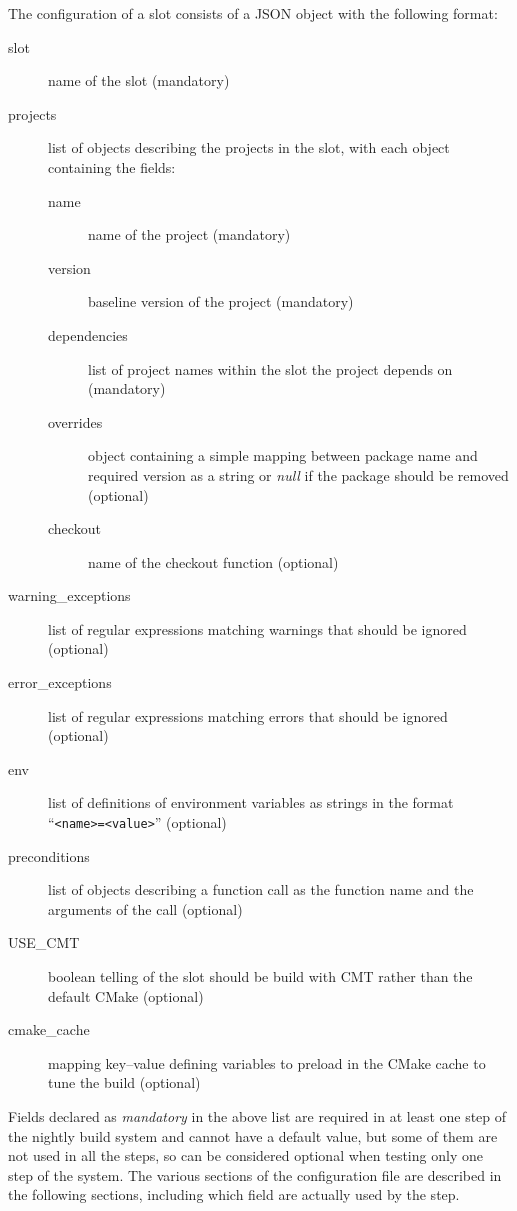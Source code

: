 \documentclass{lhcbnote}
\begin{document}
The configuration of a slot consists of a JSON object with the following format:
\begin{description}
  \item[slot] name of the slot (mandatory)
  \item[projects] list of objects describing the projects in the slot, with each
  object containing the fields:
  \begin{description}
    \item[name] name of the project (mandatory)
    \item[version] baseline version of the project (mandatory)
    \item[dependencies] list of project names within the slot the project
    depends on (mandatory)
    \item[overrides] object containing a simple mapping between package name and
    required version as a string or \emph{null} if the package should be removed
    (optional)
    \item[checkout] name of the checkout function (optional)
  \end{description}
  \item[warning\_exceptions] list of regular expressions matching warnings that
  should be ignored (optional)
  \item[error\_exceptions] list of regular expressions matching errors that
  should be ignored (optional)
  \item[env] list of definitions of environment variables as strings in the
  format ``\texttt{<name>=<value>}'' (optional)
  \item[preconditions] list of objects describing a function call as the
  function name and the arguments of the call (optional)
  \item[USE\_CMT] boolean telling of the slot should be build with CMT rather
  than the default CMake (optional)
  \item[cmake\_cache] mapping key--value defining variables to preload in the
  CMake cache to tune the build (optional)
\end{description}\nocite{CMT,CMake}
Fields declared as \emph{mandatory} in the above list are required in at least
one step of the nightly build system and cannot have a default value, but some
of them are not used in all the steps, so can be considered optional when
testing only one step of the system.  The various sections of the configuration
file are described in the following sections, including which field are actually
used by the step.
\end{document}
